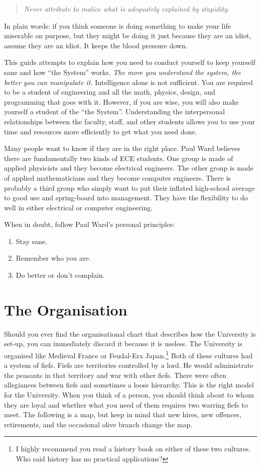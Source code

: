 \documentclass{book}
\begin{document}
\begin{quote}
\textit{Never attribute to malice what is adequately explained by stupidity.}
\end{quote}

In plain words: if you think someone is doing something to make your life miserable on purpose, but they might be doing it just because they are an idiot, assume they are an idiot. It keeps the blood pressure down.

This guide attempts to explain how you need to conduct yourself to keep yourself sane and how ``the System'' works. \textsl{The more you understand the system, the better you can manipulate it.} Intelligence alone is not sufficient. You are required to be a student of engineering and all the math, physics, design, and programming that goes with it. However, if you are wise, you will also make yourself a student of the ``the System''. Understanding the interpersonal relationships between the faculty, staff, and other students allows you to use your time and resources more efficiently to get what you need done.

Many people want to know if they are in the right place. Paul Ward believes there are fundamentally two kinds of ECE students. One group is made of applied physicists and they become electrical engineers. The other group is made of applied mathematicians and they become computer engineers. There is probably a third group who simply want to put their inflated high-school average to good use and spring-board into management. They have the flexibility to do well in either electrical or computer engineering.

When in doubt, follow Paul Ward's personal principles:

\begin{enumerate}
\item Stay sane.
\item Remember who you are.
\item Do better or don't complain.
\end{enumerate}

\chapter{The Organisation}
Should you ever find the organisational chart that describes how the University is set-up, you can immediately discard it because it is useless.  The University is organised like Medieval France or Feudal-Era Japan.\footnote{I highly recommend you read a history book on either of these two cultures. Who said history has no practical applications?} Both of these cultures had a system of fiefs. Fiefs are territories controlled by a lord. He would administrate the peasants in that territory and war with other fiefs. There were often allegiances between fiefs and sometimes a loose hierarchy. This is the right model for the University. When you think of a person, you should think about to whom they are loyal and whether what you need of them requires two warring fiefs to meet. The following is a map, but keep in mind that new hires, new offences, retirements, and the occasional olive branch change the map.
\end{document}
